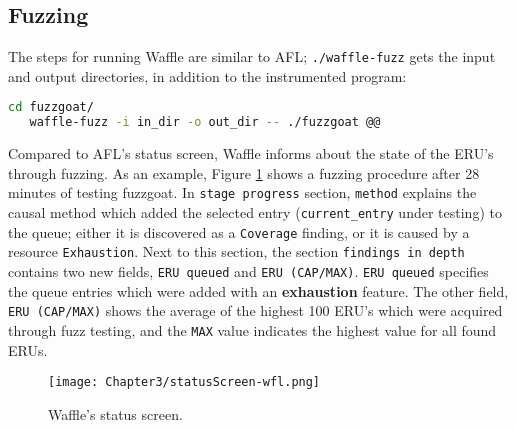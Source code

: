 
\subsection{Fuzzing}

The steps for running Waffle are similar to AFL; \texttt{./waffle-fuzz} gets the input and output directories, in addition to the instrumented program:

\begin{lstlisting}[language=bash,style=CommandStyle,label={lst:wafl-fuzzgoat-fuzz}]
   cd fuzzgoat/
   waffle-fuzz -i in_dir -o out_dir -- ./fuzzgoat @@
\end{lstlisting}

Compared to AFL's status screen, Waffle informs about the state of the ERU's through fuzzing. As an example, Figure \ref{fig:status-wfl} shows a fuzzing procedure after 28 minutes of testing fuzzgoat. In \texttt{stage progress} section, \texttt{method} explains the causal method which added the selected entry (\texttt{current\_entry} under testing) to the queue; either it is discovered as a \texttt{Coverage} finding, or it is caused by a resource \texttt{Exhaustion}. Next to this section, the section \texttt{findings in depth} contains two new fields, \texttt{ERU queued} and \texttt{ERU (CAP/MAX)}. \texttt{ERU queued} specifies the queue entries which were added with an \textbf{exhaustion} feature. The other field, \texttt{ERU (CAP/MAX)} shows the average of the highest 100 ERU's which were acquired through fuzz testing, and the \texttt{MAX} value indicates the highest value for all found ERUs. 

\begin{figure}[t]
   \texttt{[image: Chapter3/statusScreen-wfl.png]}
   \centering
   \caption{Waffle's status screen.}
   \label{fig:status-wfl}
\end{figure}

\newpage \ \newpage